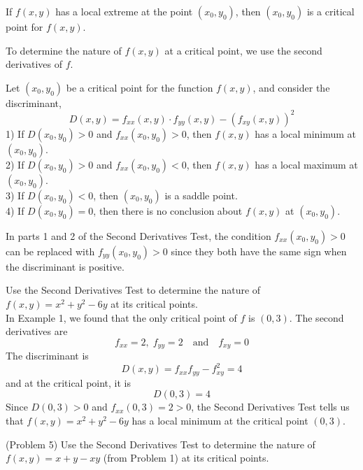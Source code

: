 \documentclass[handout]{ximera}
\begin{document}
\begin{theorem}
If $f(x,y)$ has a local extreme at the point $(x_0, y_0)$, then $(x_0, y_0)$ is a critical point for $f(x,y)$.
\end{theorem}

To determine the nature of $f(x,y)$ at a critical point, we use the second derivatives of $f$.

\begin{theorem}
Let $(x_0, y_0)$ be a critical point for the function $f(x,y)$, and consider the discriminant,
\[
D(x,y) = f_{xx}(x,y) \cdot f_{yy}(x,y) - \left(f_{xy}(x,y)\right)^2
\]
1) If $D(x_0, y_0) > 0$ and $f_{xx}(x_0, y_0) > 0$, then $f(x,y)$ has a local minimum at $(x_0, y_0)$.\\
2) If $D(x_0, y_0) > 0$ and $f_{xx}(x_0, y_0)< 0$, then $f(x,y)$ has a local maximum at $(x_0, y_0)$.\\
3) If $D(x_0, y_0) < 0$, then $(x_0, y_0)$ is a saddle point.\\
4) If $D(x_0, y_0) = 0$, then there is no conclusion about $f(x,y)$ at $(x_0, y_0)$.\\
\end{theorem}

\begin{remark}
In parts 1 and 2 of the Second Derivatives Test, the condition $f_{xx}(x_0, y_0) > 0$ can be 
replaced with $f_{yy}(x_0, y_0) > 0$ since they both have the same sign when the discriminant is positive.
\end{remark}

\begin{example}[Example 5]
Use the Second Derivatives Test to determine the nature of $f(x,y) = x^2 + y^2 - 6y$ at its critical points.\\
In Example 1, we found that the only critical point of $f$ is $(0,3)$.
The second derivatives are
\[
f_{xx} = 2,\; f_{yy} = 2 \quad \text{and} \quad f_{xy} = 0
\]
The discriminant is
\[
D(x,y) = f_{xx} f_{yy} - f_{xy}^2 = 4
\]
and at the critical point, it is
\[
D(0,3) = 4
\]
Since $D(0, 3) > 0$ and $f_{xx}(0,3) = 2 > 0$, the Second Derivatives Test tells us that $f(x,y) = x^2 + y^2 - 6y$
has a local minimum at the critical point $(0,3)$.
\end{example}

\begin{problem}(Problem 5)
Use the Second Derivatives Test to determine the nature of $f(x,y) = x+ y - xy$ (from Problem 1) at its critical points.\\
\end{problem}
\end{document}
